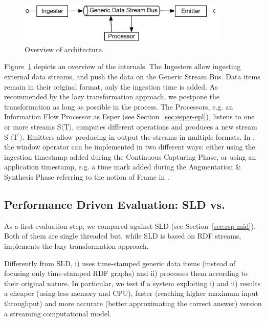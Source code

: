 \begin{figure}[t]
\centering
\includegraphics[width=0.9\textwidth]{img/comp-mod-natron-schema}
\caption{Overview of \sti{} architecture.}
\label{fig:sti}
\end{figure} 

Figure~\ref{fig:sti} depicts an overview of the \sti{} internals.
The Ingesters allow ingesting external data streams, and push the data on the Generic Stream Bus. Data items remain in their original format, only the ingestion time is added.
As recommended by the lazy transformation approach, we postpone the transformation as long as possible in the process. 
The Processors, e.g. an Information Flow Processor as Esper (see Section~\ref{sec:esper-epl}), listens to one or more streams S$\langle\mathrm{T}\rangle$, computes different operations and produces a new stream S$^{\prime}\langle\mathrm{T^{\prime}}\rangle$. 
Emitters allow \sti{} producing in output the streams in multiple formats. 
In \sti{}, the window operator can be implemented in two different ways: either using the ingestion timestamp added during the Continuous Capturing Phase, or using an application timestamp, e.g. a time mark added during the Augmentation \& Synthesis Phase referring to the notion of Frame in \frappe{}.

\subsection{Performance Driven Evaluation: SLD vs. \sti{}} \label{sec:comp-mod-eval-performace}

As a first evaluation step, we compared \sti{} against SLD (see Section~\ref{sec:rsp-mid}). Both of them are single threaded but, while SLD is based on RDF streams, \sti{} implements the lazy transformation approach.

{\color{red}
Differently from SLD, \sti{} i) uses time-stamped generic data items (instead of focusing only time-stamped RDF graphs) and ii) processes them according to their original nature.
In particular, we test if a system exploiting i) and ii) results a cheaper (using less memory and CPU), faster (reaching higher maximum input throughput) and more accurate (better approximating the correct answer) version a streaming computational model.
}

